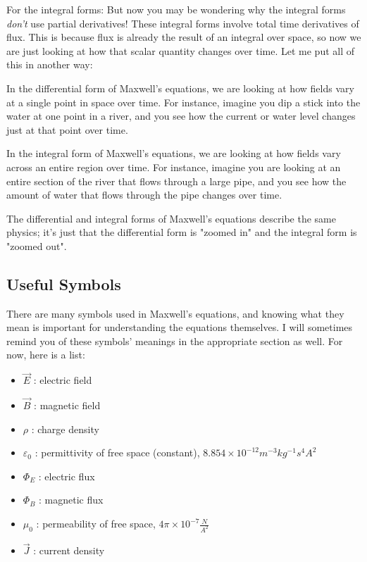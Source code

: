 \documentclass{article}
\begin{document}
\vspace{1em}

For the integral forms: But now you may be wondering why the integral forms \textit{don't} use partial derivatives! These integral forms involve total time derivatives of flux. This is because flux is already the result of an integral over space, so now we are just looking at how that scalar quantity changes over time. Let me put all of this in another way:

\vspace{1em}

In the differential form of Maxwell's equations, we are looking at how fields vary at a single point in space over time. For instance, imagine you dip a stick into the water at one point in a river, and you see how the current or water level changes just at that point over time.

\vspace{1em}
In the integral form of Maxwell's equations, we are looking at how fields vary across an entire region over time. For instance, imagine you are looking at an entire section of the river that flows through a large pipe, and you see how the amount of water that flows through the pipe changes over time.

\vspace{1em}
The differential and integral forms of Maxwell's equations describe the same physics; it's just that the differential form is "zoomed in" and the integral form is "zoomed out".

\subsection{Useful Symbols}
There are many symbols used in Maxwell's equations, and knowing what they mean is important for understanding the equations themselves. I will sometimes remind you of these symbols' meanings in the appropriate section as well. For now, here is a list:
\begin{itemize}
\item $\vec E$ : electric field
\item $\vec B$ : magnetic field
\item $\rho$ : charge density
\item $\varepsilon_0$ : permittivity of free space (constant), $8.854 \times 10^{-12} m^{-3}kg^{-1}s^4A^2$
\item $\Phi_E$ : electric flux
\item $\Phi_B$ : magnetic flux
\item $\mu_0$ : permeability of free space, $4\pi \times 10^{-7} \frac{N}{A^2}$
\item $\vec J$ : current density
\end{itemize}
\end{document}
